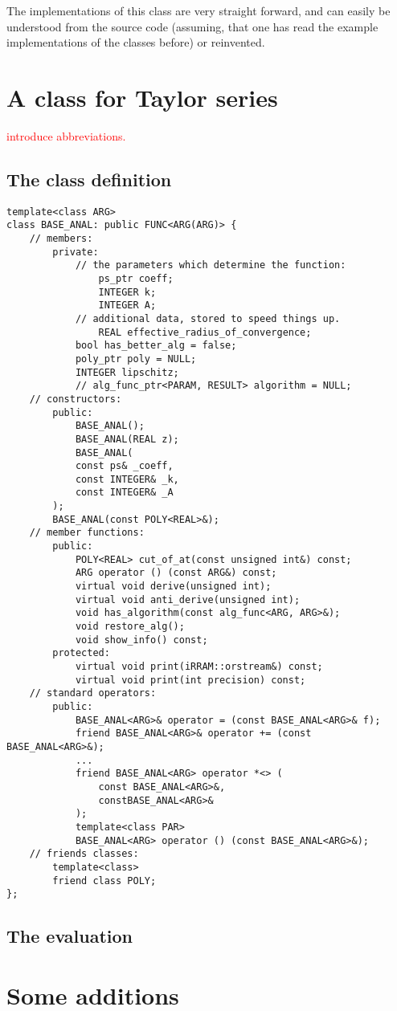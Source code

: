\documentclass{article}
\newcommand{\temp}[1]{\textcolor{red}{#1}}
\begin{document}
The implementations of this class are very straight forward, and can easily be understood from the source code (assuming, that one has read the example implementations of the classes before) or reinvented.


\section{A class for Taylor series}

\temp{introduce abbreviations.}

\subsection{The class definition}

\begin{lstlisting}
template<class ARG>
class BASE_ANAL: public FUNC<ARG(ARG)> {
	// members:
		private:
			// the parameters which determine the function:
	  			ps_ptr coeff;
	  			INTEGER k;
	  			INTEGER A;
			// additional data, stored to speed things up.
	  			REAL effective_radius_of_convergence;
			bool has_better_alg = false;
			poly_ptr poly = NULL;
			INTEGER lipschitz;
			// alg_func_ptr<PARAM, RESULT> algorithm = NULL;
	// constructors:
		public:
			BASE_ANAL();
			BASE_ANAL(REAL z);
			BASE_ANAL(
			const ps& _coeff,
			const INTEGER& _k,
			const INTEGER& _A
		);
		BASE_ANAL(const POLY<REAL>&);
	// member functions:
		public:
			POLY<REAL> cut_of_at(const unsigned int&) const;
			ARG operator () (const ARG&) const;
			virtual void derive(unsigned int);
			virtual void anti_derive(unsigned int);
			void has_algorithm(const alg_func<ARG, ARG>&);
			void restore_alg();
			void show_info() const;
		protected:
			virtual void print(iRRAM::orstream&) const;
			virtual void print(int precision) const;
 	// standard operators:
		public:
			BASE_ANAL<ARG>& operator = (const BASE_ANAL<ARG>& f);
			friend BASE_ANAL<ARG>& operator += (const BASE_ANAL<ARG>&);
			...
			friend BASE_ANAL<ARG> operator *<> (
				const BASE_ANAL<ARG>&,
				constBASE_ANAL<ARG>&
			);
			template<class PAR>
			BASE_ANAL<ARG> operator () (const BASE_ANAL<ARG>&);
  	// friends classes:
   		template<class>
   		friend class POLY;
};
\end{lstlisting}

\subsection{The evaluation}

\section{Some additions}
\end{document}
